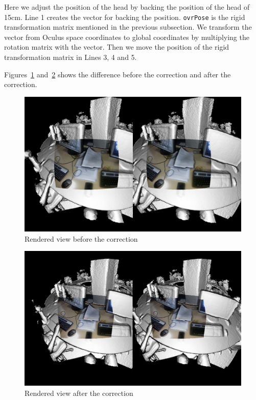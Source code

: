 \documentclass[12pt, twoside]{article}
\begin{document}
Here we adjust the position of the head by backing the position of the head of 15cm. Line 1 creates the vector for backing the position. \texttt{ovrPose} is the rigid transformation matrix mentioned in the previous subsection. We transform the vector from Oculus space coordinates to global coordinates by multiplying the rotation matrix with the vector. Then we move the position of the rigid transformation matrix in Lines 3, 4 and 5.

Figures~\ref{fig:notcorrect} and~\ref{fig:correct} shows the difference before the correction and after the correction.

\begin{figure}[!h]
  \centering
  \includegraphics[scale=0.3]{NotCorrected.png}
  \caption{\label{fig:notcorrect} Rendered view before the correction}
\end{figure}

\begin{figure}[!h]
  \centering
  \includegraphics[scale=0.3]{Corrected.png}
  \caption{\label{fig:correct} Rendered view after the correction}
\end{figure}
\end{document}
